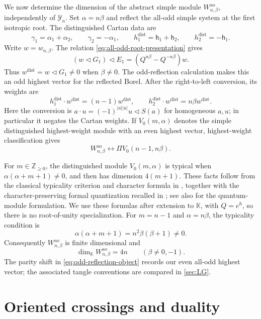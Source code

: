 \documentclass[11pt,a4paper]{article}
\newcommand{\hK}{\mathbb K}
\newcommand{\tri}{\mathbin{\triangleleft}}
\newcommand{\ao}{\mathrm{ao}}
\theoremstyle{definition}
\theoremstyle{remark}
\begin{document}
We now determine the dimension of the abstract simple module
\(W_{n,\beta}^{\ao}\), independently of \(\mathcal Y_n\).
Set \(\alpha=n\beta\) and reflect the all-odd simple system at the
first isotropic root.  The distinguished Cartan data are
\[
\gamma_1=\alpha_1+\alpha_2,\qquad
\gamma_2=-\alpha_1,\qquad
h_1^{\mathrm{dist}}=\mathsf h_1+\mathsf h_2,\qquad
h_2^{\mathrm{dist}}=-\mathsf h_1.
\]
Write \(w=w_{n,\beta}\).  The relation
\eqref{eq:all-odd-root-presentation} gives
\[
 (w\tri G_1)\tri E_1=(Q^{n\beta}-Q^{-n\beta})w.
\]
Thus \(w^{\mathrm{dist}}=w\tri G_1\neq0\) when \(\beta\neq0\).
The odd-reflection calculation
\cite{Serganova,Yamane} makes this an odd highest vector for the
reflected Borel.  After the right-to-left conversion, its weights are
\[
 h_1^{\mathrm{dist}}\cdot w^{\mathrm{dist}}=(n-1)w^{\mathrm{dist}},
 \qquad
 h_2^{\mathrm{dist}}\cdot w^{\mathrm{dist}}=n\beta
 w^{\mathrm{dist}}.
\]
Here the conversion is \(a\cdot u=(-1)^{|a||u|}u\tri S(a)\) for
homogeneous \(a,u\); in particular it negates the Cartan weights.
If \(V_0(m,\alpha)\) denotes the simple distinguished highest-weight
module with an even highest vector, highest-weight classification gives
\begin{equation}\label{eq:odd-reflection-object}
 W_{n,\beta}^{\ao}\longleftrightarrow
 \Pi V_0(n-1,n\beta).
\end{equation}

For \(m\in\mathbb Z_{\geq0}\), the distinguished module
\(V_0(m,\alpha)\) is typical when
\(\alpha(\alpha+m+1)\neq0\), and then has dimension \(4(m+1)\).
These facts follow from the classical typicality criterion and character
formula in \cite[\S1.1, equation~(2)]{GeerPatureau}, together with the
character-preserving formal quantization recalled in
\cite[\S1.2]{GeerPatureau}; see also
\cite[\S3.3, equation~(39), and Lemma~3.4]{ColoredLG} for the
quantum-module formulation.
We use these formulas after extension to \(\hK\), with \(Q=e^\hbar\),
so there is no root-of-unity specialization.
For \(m=n-1\) and \(\alpha=n\beta\), the typicality condition is
\[
 \alpha(\alpha+m+1)=n^2\beta(\beta+1)\neq0.
\]
Consequently \(W_{n,\beta}^{\ao}\) is finite dimensional and
\begin{equation}\label{eq:typical-root-dimension}
 \dim_{\hK}W_{n,\beta}^{\ao}=4n
 \qquad(\beta\neq0,-1).
\end{equation}
The parity shift in \eqref{eq:odd-reflection-object} records our even
all-odd highest vector; the associated tangle conventions are compared
in \cref{sec:LG}.

\section{Oriented crossings and duality}\label{sec:rigid}
\end{document}
